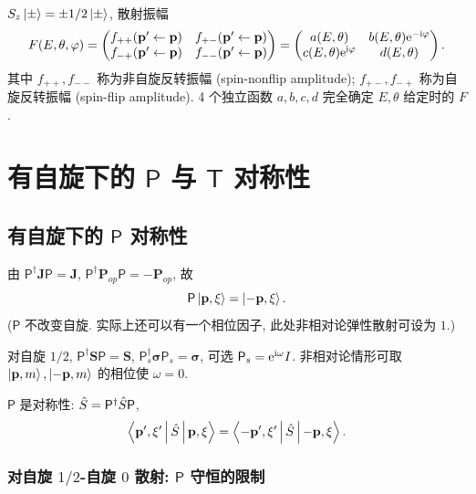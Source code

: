 \begin{example}[自旋 $1/2$ 与自旋 $0$ 散射]
$S_z\ket{\pm}=\pm 1/2\ket{\pm}$, 散射振幅
\[
F(E,\theta,\varphi)=\begin{pmatrix}f_{++}(\mathbf{p}'\leftarrow \mathbf{p})&f_{+-}(\mathbf{p}'\leftarrow \mathbf{p})\\ f_{-+}(\mathbf{p}'\leftarrow \mathbf{p})&f_{--}(\mathbf{p}'\leftarrow \mathbf{p})\end{pmatrix}=\begin{pmatrix}a(E,\theta)& b(E,\theta)\mathrm{e}^{-\mathrm{i} \varphi}\\ c(E,\theta)\mathrm{e}^{\mathrm{i}\varphi}& d(E,\theta)\end{pmatrix}.
\]
其中 $f_{++},f_{--}$ 称为非自旋反转振幅 (spin-nonflip amplitude); $f_{+-},f_{-+}$ 称为自旋反转振幅 (spin-flip amplitude). 4 个独立函数 $a,b,c,d$ 完全确定 $E,\theta$ 给定时的 $F$.
\end{example}


\section{有自旋下的 \texorpdfstring{$\mathsf{P}$}{P} 与 \texorpdfstring{$\mathsf{T}$}{T} 对称性}\label{sec:spin-PT}

\subsection{有自旋下的 \texorpdfstring{$\mathsf{P}$}{P} 对称性}

由 $\mathsf{P}^\dagger \mathbf{J}\mathsf{P}=\mathbf{J}$, $\mathsf{P}^\dagger \mathbf{P}_{op}\mathsf{P}=-\mathbf{P}_{op}$, 故
\[
\mathsf{P}\ket{\mathbf{p},\xi}=\ket{-\mathbf{p},\xi}.
\]
($\mathsf{P}$ 不改变自旋. 实际上还可以有一个相位因子, 此处非相对论弹性散射可设为 $1$.)

对自旋 $1/2$, $\mathsf{P}^\dagger \mathbf{S}\mathsf{P}=\mathbf{S}$, $\mathsf{P}_s^\dagger \bm{\sigma}\mathsf{P}_s=\bm{\sigma}$, 可选 $\mathsf{P}_s=\mathrm{e}^{\mathrm{i} \omega}I$. 非相对论情形可取 $\ket{\mathbf{p},m}, \ket{-\mathbf{p},m}$ 的相位使 $\omega=0$.

$\mathsf{P}$ 是对称性: $\hat{S}=\mathsf{P}^\dagger \hat{S} \mathsf{P}$,
\begin{equation}
\left\langle \mathbf{p}',\xi' \,\middle|\, \hat{S} \,\middle|\, \mathbf{p},\xi \right\rangle=\left\langle -\mathbf{p}',\xi' \,\middle|\, \hat{S} \,\middle|\, -\mathbf{p},\xi \right\rangle.
\end{equation}

\subsubsection*{对自旋 $1/2$-自旋 $0$ 散射: \texorpdfstring{$\mathsf{P}$}{P} 守恒的限制}

